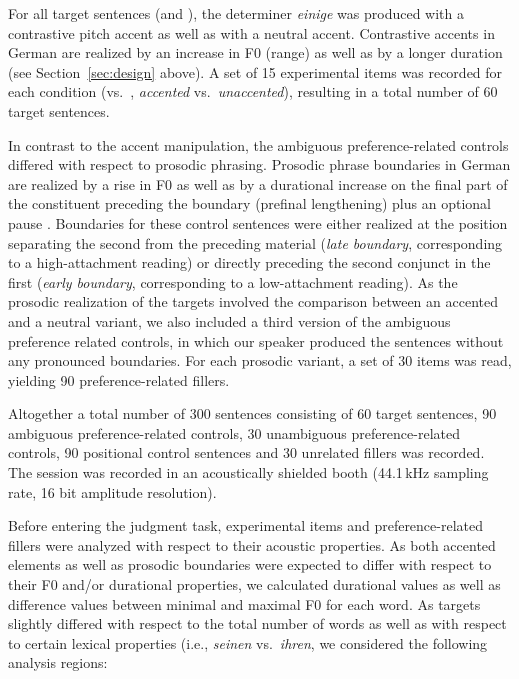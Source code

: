 \documentclass[fleqn,reqno,10pt,draft]{article}
\newcommand{\as}{\acro{as}}
\renewcommand{\es}{\acro{es}}
\begin{document}
For all target sentences (\as and \es), the determiner \emph{einige} was
produced with a contrastive pitch accent as well as with a neutral
accent. Contrastive accents in German are realized by an increase in F0 (range)
as well as by a longer duration (see Section~\ref{sec:design} above). A set of 15 
experimental items was recorded for each condition (\as vs.~\es, \emph{accented} 
vs.~\emph{unaccented}), resulting in a total number of 60 target sentences.

In contrast to the accent manipulation, the ambiguous preference-related controls
differed with respect to prosodic phrasing. Prosodic phrase boundaries
in German are realized by a rise in F0 as well as by a durational
increase on the final part of the constituent preceding the boundary
(prefinal lengthening) plus an optional pause \citep[e.g.][]{Vaissiere83,Fery93}.
Boundaries for these control sentences were either realized at the position 
separating the second {\small {}}
from the preceding material (\emph{late boundary}, corresponding to a
high-attachment reading) or directly preceding the second conjunct in
the first {\small {}} (\emph{early boundary}, corresponding to a
low-attachment reading). As the prosodic realization of the targets
involved the comparison between an accented and a neutral variant, we
also included a third version of the ambiguous preference related controls, in which our
speaker produced the sentences without any pronounced
boundaries. For each prosodic variant, a set of
30 items was read, yielding 90 preference-related fillers.

Altogether a total number of 300 sentences consisting of 60 target sentences, 90 ambiguous preference-related controls, 30 unambiguous preference-related controls, 90 positional control sentences and 30 unrelated fillers was recorded. The session was recorded in an acoustically
shielded booth (44.1\,kHz sampling rate, 16 bit amplitude resolution).

Before entering the judgment task, experimental items and
preference-related fillers were analyzed with respect to their acoustic
properties. As both accented elements as well as prosodic boundaries
were expected to differ with respect to their F0 and/or durational
properties, we calculated durational values as well as difference
values between minimal and maximal F0 for each word. As targets
slightly differed with respect to the total number of words as well as
with respect to certain lexical properties (i.e., \emph{seinen}
vs.~\emph{ihren}, we considered the following analysis regions:
\end{document}
